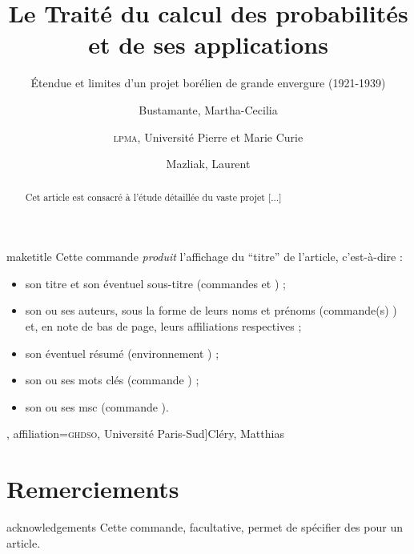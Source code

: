 \documentclass[french,nolocaltoc]{nwejmart}
\newtheorem[style=definition]{fait}
\newtheorem[title=expérience]{experience}
\newtheorem[title-plural=anneaux]{anneau}
\newtheorem[title=idéal,title-plural=idéaux]{ideal}
\begin{document}
\begin{docCommand}[doc description=\mandatory]{maketitle}{}
  Cette commande \emph{produit} l'affichage du \enquote{titre} de l'article,
  c'est-à-dire :
  \begin{itemize}
  \item son titre et son éventuel sous-titre (commandes  et
    ) ;
  \item son ou ses auteurs, sous la forme de leurs noms et prénoms (commande(s)
    ) et, en note de bas de page, leurs affiliations respectives ;
  \item son éventuel résumé (environnement ) ;
  \item son ou ses mots clés (commande ) ;
  \item son ou ses \acrshort{msc} (commande ).
  \end{itemize}
\end{docCommand}

\begin{bodycode}[listing options={deletekeywords={[2]title,article},deletekeywords={[5]keywords}}]
\title[Le Traité du calcul des probabilités]{Le Traité du calcul des
  probabilités et de ses applications}
\subtitle[Étendue et limites d'un projet borélien]{Étendue et limites
  d'un projet borélien de grande envergure (1921-1939)}
%
\author[
  affiliation={Laboratoire \textsc{sphere}, Université Paris Diderot}
  ]{Bustamante, Martha-Cecilia}
\author[
  affiliation=[aff2]{\textsc{lpma}, Université Pierre et Marie Curie},
  affiliation={\textsc{ghdso}, Université Paris-Sud}]{Cléry, Matthias}
\author[
  affiliationtagged={aff2}
]{Mazliak, Laurent}
%
\begin{abstract}
  Cet article est consacré à l'étude détaillée du vaste projet [...]
\end{abstract}
%
%
\maketitle
\end{bodycode}

\section{Remerciements}
\label{sec:remerciements}

\begin{docCommand}{acknowledgements}{}
  Cette commande, facultative, permet de spécifier des  pour
  un article.
\end{docCommand}
\end{document}
